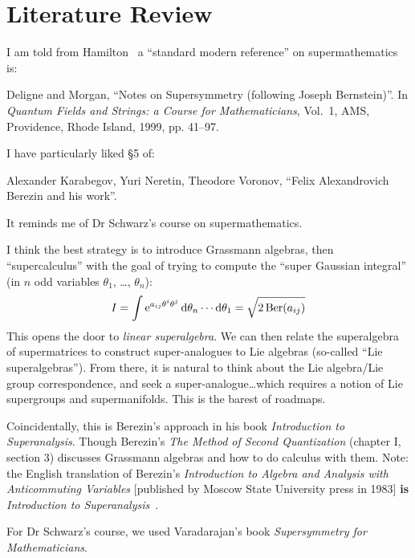 \section{Literature Review}

I am told from Hamilton~ a ``standard modern
reference'' on supermathematics is:
\begin{enumerate}[label={[\arabic*]}]
\item Deligne and Morgan,
  ``Notes on Supersymmetry (following Joseph Bernstein)''.
  In \textit{Quantum Fields and Strings: a Course for Mathematicians}, Vol.~1, AMS, Providence, Rhode Island, 1999, pp. 41--97.
\end{enumerate}
I have particularly liked \S5 of:
\begin{enumerate}[resume,label={[\arabic*]}]
\item Alexander Karabegov, Yuri Neretin, Theodore Voronov,
  ``Felix Alexandrovich Berezin and his work''.
\end{enumerate}
It reminds me of Dr Schwarz's course on supermathematics.

I think the best strategy is to introduce Grassmann algebras, then
``supercalculus'' with the goal of trying to compute the ``super
Gaussian integral'' (in $n$ odd variables $\theta_{1}$, \dots, $\theta_{n}$):
\begin{equation}
I = \int\mathrm{e}^{a_{ij}\theta^{i}\theta^{j}}\,\mathrm{d}\theta_{n}\cdots\mathrm{d}\theta_{1}
= \sqrt{2\operatorname{Ber}(a_{ij})}
\end{equation}
This opens the door to \emph{linear superalgebra}. We can then relate
the superalgebra of supermatrices to construct super-analogues to Lie
algebras (so-called ``Lie superalgebras''). From there, it is natural to
think about the Lie algebra/Lie group correspondence, and seek a
super-analogue\dots which requires a notion of Lie supergroups and
supermanifolds. This is the barest of roadmaps.

Coincidentally, this is Berezin's approach in his book
\textit{Introduction to Superanalysis}. Though Berezin's
\textit{The Method of Second Quantization} (chapter I, section 3)
discusses Grassmann algebras and how to do calculus with them.
Note: the English translation of Berezin's \textit{Introduction to Algebra and Analysis with Anticommuting Variables}
[published by Moscow State University press in 1983] \textbf{is}
\textit{Introduction to Superanalysis}~\cite{Berezin:1987wh}.

For Dr Schwarz's course, we used Varadarajan's book
\textit{Supersymmetry for Mathematicians}.


